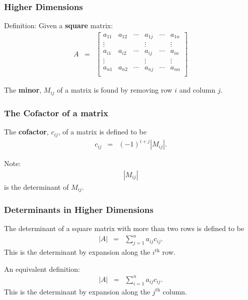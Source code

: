 \begin{frame}
  \frametitle{Higher Dimensions}

  Definition: Given a \textbf{square} matrix:
  \begin{eqnarray*}
    A & = & 
    \left[
      \begin{array}{rrr|r|rr}
        a_{11} & a_{12} & \cdots & a_{1j} & \cdots & a_{1n} \\
        \vdots &       &        & \vdots &        & \vdots \\ \hline
        a_{i1} & a_{i2} & \cdots & a_{ij} & \cdots & a_{in} \\ \hline
        \vdots &       &        & \vdots &        & \vdots \\
        a_{n1} & a_{n2} & \cdots & a_{nj} & \cdots & a_{nn} \\
      \end{array}
    \right]
  \end{eqnarray*}

  The \textbf{minor}, $M_{ij}$ of a matrix is found by removing row
  $i$ and column $j$.

\end{frame}


\begin{frame}
  \frametitle{The Cofactor of a matrix}

  The \textbf{cofactor}, $c_{ij}$, of a matrix is defined to be 
  \begin{eqnarray*}
    c_{ij} & = & (-1)^{i+j}\left| M_{ij} \right|.
  \end{eqnarray*}

  Note:
  \begin{eqnarray*}
    \left| M_{ij} \right|
  \end{eqnarray*}
  is the determinant of $M_{ij}$.

\end{frame}


\begin{frame}
  \frametitle{Determinants in Higher Dimensions}

  The determinant of a square matrix with more than two rows is
  defined to be
  \begin{eqnarray*}
    \left| A \right| & = & \sum^n_{j=1} a_{ij} c_{ij}.
  \end{eqnarray*}
  This is the determinant by expansion along the $i^{\mathrm{th}}$
  row.

  An equivalent definition:
  \begin{eqnarray*}
    \left| A \right| & = & \sum^n_{i=1} a_{ij} c_{ij}.
  \end{eqnarray*}
  This is the determinant by expansion along the $j^{\mathrm{th}}$
  column.

  

\end{frame}


